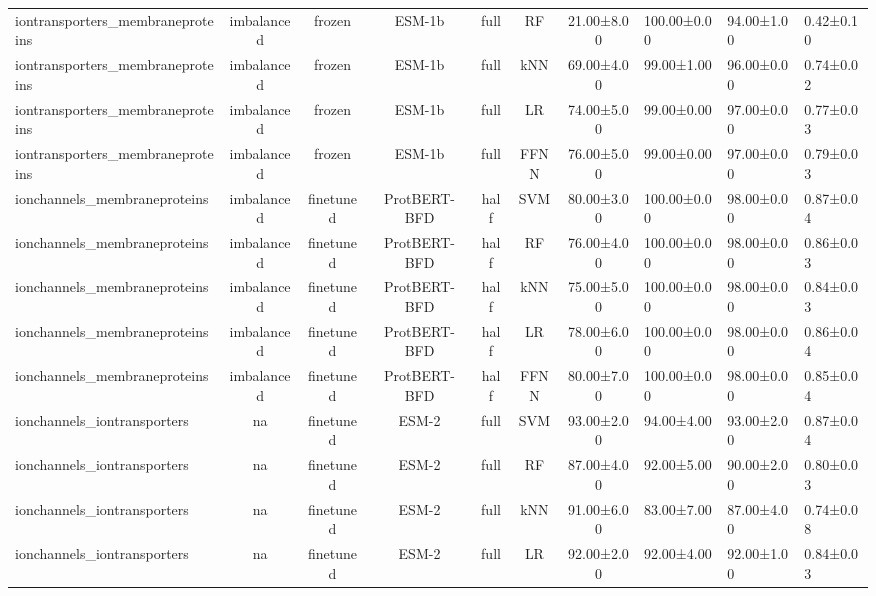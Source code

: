\begin{tabular}{lcccccc}
iontransporters\_membraneproteins & imbalanced &         frozen &       ESM-1b &      full &         RF &  21.00±8.00 & 100.00±0.00 &  94.00±1.00 & 0.42±0.10 \\
iontransporters\_membraneproteins & imbalanced &         frozen &       ESM-1b &      full &        kNN &  69.00±4.00 &  99.00±1.00 &  96.00±0.00 & 0.74±0.02 \\
iontransporters\_membraneproteins & imbalanced &         frozen &       ESM-1b &      full &         LR &  74.00±5.00 &  99.00±0.00 &  97.00±0.00 & 0.77±0.03 \\
iontransporters\_membraneproteins & imbalanced &         frozen &       ESM-1b &      full &       FFNN &  76.00±5.00 &  99.00±0.00 &  97.00±0.00 & 0.79±0.03 \\
    ionchannels\_membraneproteins & imbalanced &      finetuned & ProtBERT-BFD &      half &        SVM &  80.00±3.00 & 100.00±0.00 &  98.00±0.00 & 0.87±0.04 \\
    ionchannels\_membraneproteins & imbalanced &      finetuned & ProtBERT-BFD &      half &         RF &  76.00±4.00 & 100.00±0.00 &  98.00±0.00 & 0.86±0.03 \\
    ionchannels\_membraneproteins & imbalanced &      finetuned & ProtBERT-BFD &      half &        kNN &  75.00±5.00 & 100.00±0.00 &  98.00±0.00 & 0.84±0.03 \\
    ionchannels\_membraneproteins & imbalanced &      finetuned & ProtBERT-BFD &      half &         LR &  78.00±6.00 & 100.00±0.00 &  98.00±0.00 & 0.86±0.04 \\
    ionchannels\_membraneproteins & imbalanced &      finetuned & ProtBERT-BFD &      half &       FFNN &  80.00±7.00 & 100.00±0.00 &  98.00±0.00 & 0.85±0.04 \\
     ionchannels\_iontransporters &         na &      finetuned &        ESM-2 &      full &        SVM &  93.00±2.00 &  94.00±4.00 &  93.00±2.00 & 0.87±0.04 \\
     ionchannels\_iontransporters &         na &      finetuned &        ESM-2 &      full &         RF &  87.00±4.00 &  92.00±5.00 &  90.00±2.00 & 0.80±0.03 \\
     ionchannels\_iontransporters &         na &      finetuned &        ESM-2 &      full &        kNN &  91.00±6.00 &  83.00±7.00 &  87.00±4.00 & 0.74±0.08 \\
     ionchannels\_iontransporters &         na &      finetuned &        ESM-2 &      full &         LR &  92.00±2.00 &  92.00±4.00 &  92.00±1.00 & 0.84±0.03 \\

\end{tabular}
